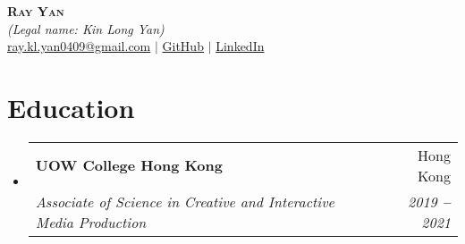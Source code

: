 \documentclass[letterpaper,11pt]{article}
\makeatletter
\newcommand{\resumeSubheading}[4]{
  \vspace{-2pt}\item
    \begin{tabular*}{0.97\textwidth}[t]{l@{\extracolsep{\fill}}r}
      \textbf{#1} & #2 \\
      \textit{\small#3} & \textit{\small #4} \\
    \end{tabular*}\vspace{-7pt}
}
\newcommand{\resumeSubHeadingListStart}{\begin{itemize}[leftmargin=0.15in, label={}]}
\newcommand{\resumeSubHeadingListEnd}{\end{itemize}}
\makeatother
\begin{document}

\begin{center}
    \textbf{\Huge \scshape Ray Yan} \\ \vspace{1pt}
    \small \textit{(Legal name: Kin Long Yan)} \\ \vspace{3pt}
    \small
    \faAt \hspace{.5pt} \href{mailto:ray.kl.yan0409@gmail.com}{ray.kl.yan0409@gmail.com}
    $|$
    \faGithub \hspace{.5pt} \href{https://github.com/chkpcc1a035}{GitHub}
    $|$
    \faLinkedinSquare \hspace{.5pt} \href{https://www.linkedin.com/in/kin-long-yan-7a6950168/}{LinkedIn}
\end{center}




\section{Education}
  \vspace{3pt}
  \resumeSubHeadingListStart
    
    \resumeSubheading
      {UOW College Hong Kong}{Hong Kong}
      {Associate of Science in Creative and Interactive Media Production}{2019 \textbf{--} 2021}
    
  \resumeSubHeadingListEnd



\end{document}
